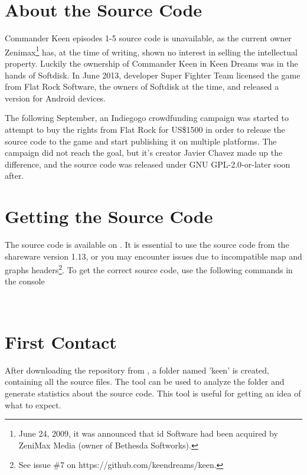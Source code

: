 \documentclass[book.tex]{subfiles}
\begin{document}
\label{chapter_software_architecture}
\section{About the Source Code}
Commander Keen episodes 1-5 source code is unavailable, as the current owner Zenimax\footnote{June 24, 2009, it was announced that id Software had been acquired by ZeniMax Media (owner of Bethesda Softworks).} has, at the time of writing, shown no interest in selling the intellectual property. Luckily the ownership of Commander Keen in Keen Dreams was in the hands of Softdisk. In June 2013, developer Super Fighter Team licensed the game from Flat Rock Software, the owners of Softdisk at the time, and released a version for Android devices.\\

\par
The following September, an Indiegogo crowdfunding campaign was started to attempt to buy the rights from Flat Rock for US\$1500 in order to release the source code to the game and start publishing it on multiple platforms. The campaign did not reach the goal, but it's creator Javier Chavez made up the difference, and the source code was released under GNU GPL-2.0-or-later soon after.


\section{Getting the Source Code}
\label{section:source_code}
The source code is available on . It is essential to use the source code from the shareware version 1.13, or you may encounter issues due to incompatible map and graphs headers\footnote{See issue \#7 on https://github.com/keendreams/keen.}. To get the correct source code, use the following commands in the console \\

\par
{}\\

\section{First Contact}
After downloading the repository from , a folder named 'keen' is created, containing all the source files. The  tool can be used to analyze the folder and generate statistics about the source code. This tool is useful for getting an idea of what to expect.\\
\end{document}
